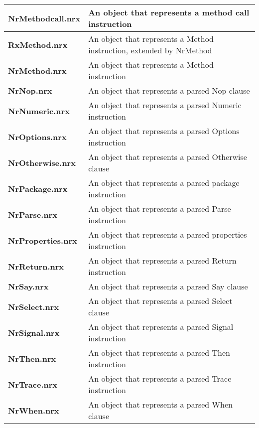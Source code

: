 \begin{table}
\begin{tabularx}{\textwidth}{>{\bfseries}lX}
    NrMethodcall.nrx    &An object that represents a method call instruction
    \\\midrule
    RxMethod.nrx    &An object that represents a Method instruction, extended by NrMethod
    \\\midrule
    NrMethod.nrx    &An object that represents a Method instruction
    \\\midrule
    NrNop.nrx       &An object that represents a parsed Nop clause
    \\\midrule
    NrNumeric.nrx   &An object that represents a parsed Numeric instruction
    \\\midrule
    NrOptions.nrx   &An object that represents a parsed Options instruction
    \\\midrule
    NrOtherwise.nrx &An object that represents a parsed Otherwise clause
    \\\midrule
    NrPackage.nrx   &An object that represents a parsed package instruction
    \\\midrule
    NrParse.nrx     &An object that represents a parsed Parse instruction
    \\\midrule
    NrProperties.nrx    &An object that represents a parsed properties instruction
    \\\midrule
    NrReturn.nrx    &An object that represents a parsed Return instruction
    \\\midrule
    NrSay.nrx       &An object that represents a parsed Say clause
    \\\midrule
    NrSelect.nrx    &An object that represents a parsed Select clause
    \\\midrule
    NrSignal.nrx    &An object that represents a parsed Signal instruction
    \\\midrule
    NrThen.nrx      &An object that represents a parsed Then instruction
    \\\midrule
    NrTrace.nrx     &An object that represents a parsed Trace instruction
    \\\midrule
    NrWhen.nrx      &An object that represents a parsed When clause
    \\\bottomrule
\end{tabularx}
\end{table}


